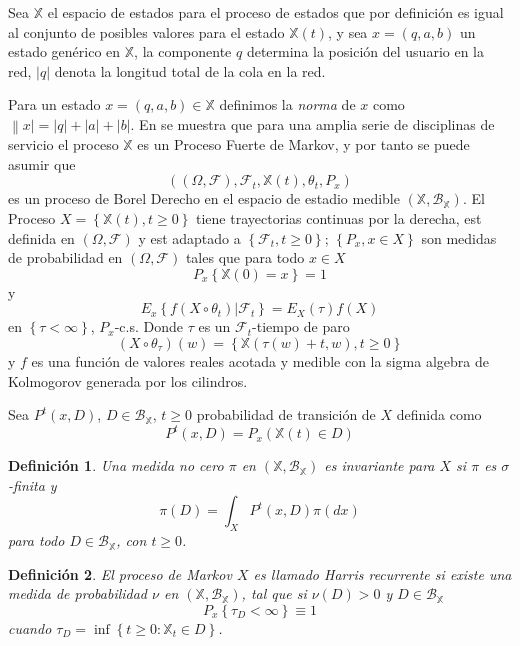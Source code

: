 \documentclass{article}
\newtheorem{Def}{Definición}
\begin{document}
Sea $\mathbb{X}$ el espacio de estados para el proceso de estados
que por definici\'on es igual  al conjunto de posibles valores
para el estado $\mathbb{X}\left(t\right)$, y sea
$x=\left(q,a,b\right)$ un estado gen\'erico en $\mathbb{X}$, la
componente $q$ determina la posici\'on del usuario en la red,
$|q|$ denota la longitud total de la cola en la red.

Para un estado $x=\left(q,a,b\right)\in\mathbb{X}$ definimos la
{\em norma} de $x$ como $\left\|x\right|=|q|+|a|+|b|$. En
\cite{Dai} se muestra que para una amplia serie de disciplinas de
servicio el proceso $\mathbb{X}$ es un Proceso Fuerte de Markov, y
por tanto se puede asumir que
\[\left(\left(\Omega,\mathcal{F}\right),\mathcal{F}_{t},\mathbb{X}\left(t\right),\theta_{t},P_{x}\right)\]
es un proceso de Borel Derecho en el espacio de estadio medible
$\left(\mathbb{X},\mathcal{B}_{\mathbb{X}}\right)$. El Proceso
$X=\left\{\mathbb{X}\left(t\right),t\geq0\right\}$ tiene
trayectorias continuas por la derecha, est definida en
$\left(\Omega,\mathcal{F}\right)$ y est adaptado a
$\left\{\mathcal{F}_{t},t\geq0\right\}$; $\left\{P_{x},x\in
X\right\}$ son medidas de probabilidad en
$\left(\Omega,\mathcal{F}\right)$ tales que para todo $x\in X$
\[P_{x}\left\{\mathbb{X}\left(0\right)=x\right\}=1\] y
\[E_{x}\left\{f\left(X\circ\theta_{t}\right)|\mathcal{F}_{t}\right\}=E_{X}\left(\tau\right)f\left(X\right)\]
en $\left\{\tau<\infty\right\}$, $P_{x}$-c.s. Donde $\tau$ es un
$\mathcal{F}_{t}$-tiempo de paro
\[\left(X\circ\theta_{\tau}\right)\left(w\right)=\left\{\mathbb{X}\left(\tau\left(w\right)+t,w\right),t\geq0\right\}\]
y $f$ es una funci\'on de valores reales acotada y medible con la
sigma algebra de Kolmogorov generada por los cilindros.

Sea $P^{t}\left(x,D\right)$, $D\in\mathcal{B}_{\mathbb{X}}$,
$t\geq0$ probabilidad de transici\'on de $X$ definida como
\[P^{t}\left(x,D\right)=P_{x}\left(\mathbb{X}\left(t\right)\in
D\right)\]

\begin{Def}
Una medida no cero $\pi$ en
$\left(\mathbb{X},\mathcal{B}_{\mathbb{X}}\right)$ es {\em
invariante} para $X$ si $\pi$ es $\sigma$-finita y
\[\pi\left(D\right)=\int_{X}P^{t}\left(x,D\right)\pi\left(dx\right)\]
para todo $D\in \mathcal{B}_{\mathbb{X}}$, con $t\geq0$.
\end{Def}

\begin{Def}
El proceso de Markov $X$ es llamado {\em Harris recurrente} si
existe una medida de probabilidad $\nu$ en
$\left(\mathbb{X},\mathcal{B}_{\mathbb{X}}\right)$, tal que si
$\nu\left(D\right)>0$ y $D\in\mathcal{B}_{\mathbb{X}}$
\[P_{x}\left\{\tau_{D}<\infty\right\}\equiv1\] cuando
$\tau_{D}=\inf\left\{t\geq0:\mathbb{X}_{t}\in D\right\}$.
\end{Def}
\end{document}
